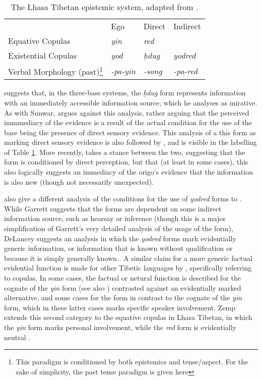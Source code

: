 \begin{table}
        \begin{tabular}{llll}
         & Ego & Direct & Indirect \\
        Equative Copulas & \textit{yin} & \multicolumn{2}{l}{\textit{red}} \\
        Existential Copulas & \textit{yod} & \textit{ḥdug} & \textit{yodred} \\
        Verbal Morphology (past)\footnote{This paradigm is conditioned by both epistemics and tense/aspect. For the sake of simplicity, the past tense paradigm is given here} & \textit{-pa-yin} & \textit{-song} & \textit{-pa-red}
        \end{tabular}
        \caption{The Lhasa Tibetan epistemic system, adapted from .}\label{t:Description:LhasaEpistemics}
 \end{table}

 suggests that, in the three-base systems, the \textit{ḥdug} form represents information with an immediately accessible information source, which he analyses as mirative. As with Sunwar,  argues against this analysis, rather arguing that the perceived immmediacy of the evidence is a result of the actual condition for the use of the base being the presence of direct sensory evidence. This analysis of a this form as marking direct sensory evidence is also followed by , and is visible in the labelling of Table \ref{t:Description:LhasaEpistemics}. More recently,  takes a stance between the two, suggesting that the form is conditioned by direct perception, but that (at least in some cases), this also logically suggests an immediacy of the origo's evidence that the information is also new (though not necessarily unexpected).

 also give a different analysis of the conditions for the use of \textit{yodred} forms to . While Garrett suggests that the forms are dependent on some indirect information source, such as hearsay or inference (though this is a major simplification of Garrett's very detailed analysis of the usage of the form), DeLancey suggests an analysis in which the \textit{yodred} forms mark evidentially generic information, or information that is known without qualification or because it is simply generally known \cite[392]{DeLancey2017Tibetan}. A similar claim for a more generic factual evidential function is made for other Tibetic languages by , specifically referring to copulas. In some cases, the factual or netural function is described for the cognate of the \textit{yin} form (see also ) contrasted against an evidentially marked alternative, and some cases for the form in contrast to the cognate of the \textit{yin} form, which in these latter cases marks specific speaker involvement. Zemp extends this second category to the equative copulas in Lhasa Tibetan, in which the \textit{yin} form marks personal involvement, while the \textit{red} form is evidentially neutral \cite[39]{Zemp2020}.

